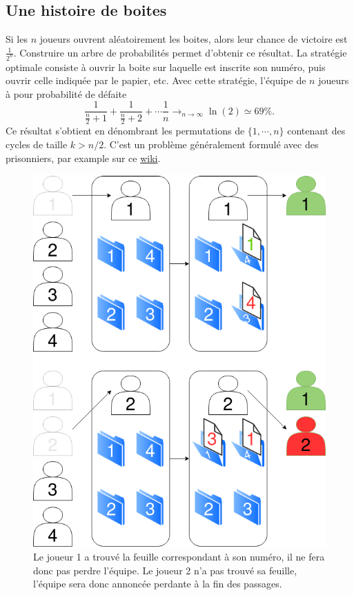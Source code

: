 \documentclass[a4paper,10pt,oneside]{article}
\begin{document}
\subsection{Une histoire de boites}

Si les $n$ joueurs ouvrent aléatoirement les boites, alors leur chance de victoire est $\frac{1}{2^n}$. 
Construire un arbre de probabilités permet d'obtenir ce résultat.
La stratégie optimale consiste à ouvrir la boite sur laquelle est inscrite son numéro, puis ouvrir celle indiquée par le papier, etc. 
Avec cette stratégie, l'équipe de $n$ joueurs à pour probabilité de défaite
\[
  \frac{1}{\frac{n}{2} +1} + \frac{1}{\frac{n}{2} + 2} + \cdots \frac{1}{n} 
  \rightarrow_{n\rightarrow \infty} \ln(2) \simeq 69\%.
\]
Ce résultat s'obtient en dénombrant les permutations de $\{1,\cdots,n\}$ contenant des cycles de taille $k > n/2$.
C'est un problème généralement formulé avec des prisonniers, par example sur ce \href{https://en.wikipedia.org/wiki/100_prisoners_problem}{wiki}.


\begin{figure}[!ht]
\centering
\includegraphics[height=0.3\textheight]{figures/indice_boites.png}
\caption{Le joueur 1 a trouvé la feuille correspondant à son numéro, il ne fera donc pas perdre l'équipe. Le joueur 2 n'a pas trouvé sa feuille, l'équipe sera donc annoncée perdante à la fin des passages.}
\end{figure}



  

\end{document}
